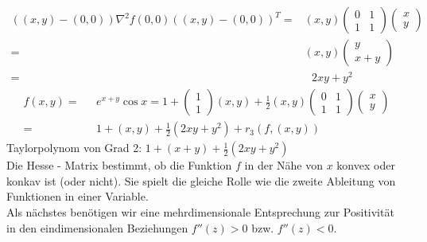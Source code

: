 \begin{align*}
\left( {\left( {x,y} \right) - \left( {0,0} \right)} \right){\nabla ^2}f\left( {0,0} \right){\left( {\left( {x,y} \right) - \left( {0,0} \right)} \right)^T} = & \left( {x,y} \right)\left( {\begin{array}{*{20}{c}}
0&1\\
1&1
\end{array}} \right)\left( {\begin{array}{*{20}{c}}
x\\
y
\end{array}} \right)\\
 = & \left( {x,y} \right)\left( {\begin{array}{*{20}{c}}
y\\
{x + y}
\end{array}} \right)\\
 = &\text{ }2xy+y^2
\end{align*}
\begin{align*}
f\left( {x,y} \right) = & \text{ }{e^{x + y}}\cos x = 1 + \left( {\begin{array}{*{20}{c}}
1\\
1
\end{array}} \right)\left( {x,y} \right) + \frac{1}{2}\left( {x,y} \right)\left( {\begin{array}{*{20}{c}}
0&1\\
1&1
\end{array}} \right)\left( {\begin{array}{*{20}{c}}
x\\
y
\end{array}} \right)\\
 = & \text{ } 1 + \left( {x,y} \right) + \frac{1}{2}\left( {2xy + {y^2}} \right) + {r_3}\left( {f,\left( {x,y} \right)} \right)
\end{align*}
Taylorpolynom von Grad 2: $1+\left( x+y\right)+\frac{1}{2}\left( 2xy+y^2\right)$\\

Die Hesse - Matrix bestimmt, ob die Funktion $f$ in der Nähe von $x$ konvex oder konkav ist (oder nicht). Sie spielt die gleiche Rolle wie die zweite Ableitung von Funktionen in einer Variable. \\

Als nächstes benötigen wir eine mehrdimensionale Entsprechung zur Positivität  in den eindimensionalen Beziehungen $f''(z)>0$ bzw. $f''(z)<0$.

